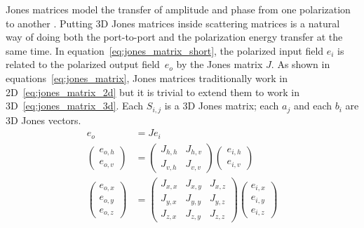 \documentclass[a4paper,11pt]{article}
\begin{document}
Jones matrices model the transfer of amplitude and phase from one polarization to another \cite{hecht2002optics}.
Putting 3D Jones matrices inside scattering matrices is a natural way of doing both the port-to-port and the polarization energy transfer at the same time.
In equation~\eqref{eq:jones_matrix_short}, the polarized input field $e_i$ is related to the polarized output field~$e_o$ by the Jones matrix $J$.
As shown in equations~\eqref{eq:jones_matrix}, Jones matrices traditionally work in 2D~\eqref{eq:jones_matrix_2d} but it is trivial to extend them to work in 3D~\eqref{eq:jones_matrix_3d}.
Each $S_{i, j}$ is a 3D Jones matrix; each $a_j$ and each $b_i$ are 3D Jones vectors.
\begin{subequations}    
    \begin{align}
        e_o &= J e_i
        \label{eq:jones_matrix_short}
        \\
        \begin{pmatrix}
            e_{o, h}\\
            e_{o, v}
        \end{pmatrix}
        &=
        \begin{pmatrix}
            J_{h, h}   &   J_{h, v} \\
            J_{v, h}   &   J_{v, v}
        \end{pmatrix}
        \begin{pmatrix}
            e_{i, h}\\
            e_{i, v}
        \end{pmatrix}
        \label{eq:jones_matrix_2d}
        \\
        \begin{pmatrix}
            e_{o, x}\\
            e_{o, y}\\
            e_{o, z}
        \end{pmatrix}
        &=
        \begin{pmatrix}
            J_{x, x}   &   J_{x, y}   &   J_{x, z} \\
            J_{y, x}   &   J_{y, y}   &   J_{y, z} \\
            J_{z, x}   &   J_{z, y}   &   J_{z, z}
        \end{pmatrix}
        \begin{pmatrix}
            e_{i, x}\\
            e_{i, y}\\
            e_{i, z}
        \end{pmatrix}
        \label{eq:jones_matrix_3d}
    \end{align}
    \label{eq:jones_matrix}
\end{subequations}
\end{document}
